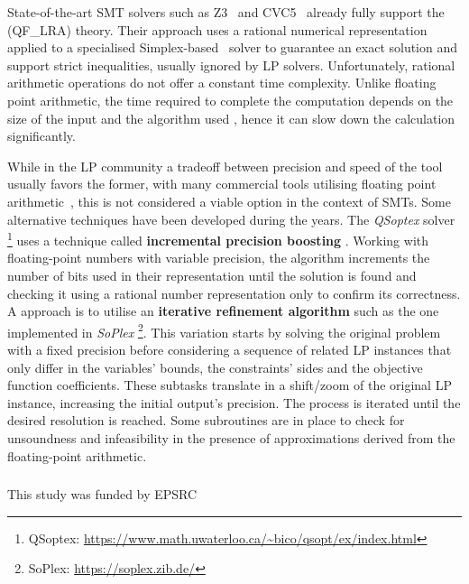 \documentclass[runningheads]{llncs}
\begin{document}
State-of-the-art SMT solvers such as Z3~\cite{ref:z3} and CVC5~\cite{ref:cvc5} already fully support the (QF\_LRA) theory.
Their approach uses a rational numerical representation applied to a specialised Simplex-based~\cite{ref:simplex} solver to guarantee an exact solution and support strict inequalities, usually ignored by LP solvers.
Unfortunately, rational arithmetic operations do not offer a constant time complexity. %
Unlike floating point arithmetic, the time required to complete the computation depends on the size of the input and the algorithm used \cite{ref:fft-mult}, hence it can slow down the calculation significantly.

While in the LP community a tradeoff between precision and speed of the tool usually favors the former, with many commercial tools utilising floating point arithmetic~\cite{ref:gurobi}, this is not considered a viable option in the context of SMTs.
Some alternative techniques have been developed during the years.
The \textit{QSoptex} solver \footnote{QSoptex: \url{https://www.math.uwaterloo.ca/~bico/qsopt/ex/index.html}} uses a technique called \textbf{incremental precision boosting} \cite{ref:precision-boosting}.
Working with floating-point numbers with variable precision, the algorithm increments the number of bits used in their representation until the solution is found and checking it using a rational number representation only to confirm its correctness.
A approach is to utilise an \textbf{iterative refinement algorithm} \cite{ref:iterative-refinement} such as the one implemented in \textit{SoPlex} \footnote{SoPlex: \url{https://soplex.zib.de/}}.
This variation starts by solving the original problem with a fixed precision before considering a sequence of related LP instances that only differ in the variables' bounds, the constraints' sides and the objective function coefficients.
These subtasks translate in a shift/zoom of the original LP instance, increasing the initial output's precision.
The process is iterated until the desired resolution is reached.
Some subroutines are in place to check for unsoundness and infeasibility in the presence of approximations derived from the floating-point arithmetic.

%

\begin{credits}
    \subsubsection{\ackname} This study was funded by EPSRC
\end{credits}



\end{document}
